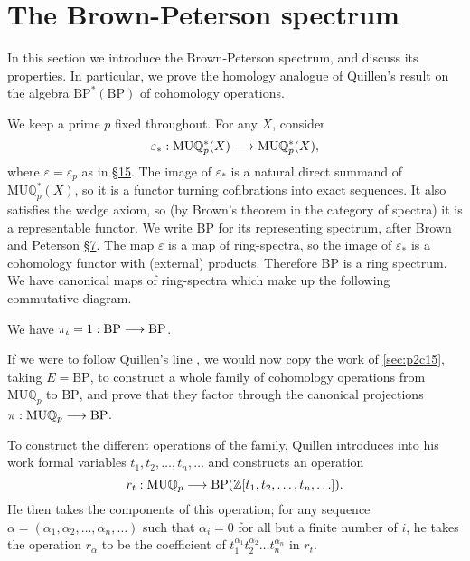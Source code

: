 \documentclass[../main]{subfiles}
\begin{document}
\label{sec:p2c16}
\chapter{The Brown-Peterson spectrum}
In this section we introduce the Brown-Peterson spectrum, and discuss its properties. In particular, we prove the homology analogue of Quillen's result on the algebra $\mathrm{BP}^\ast(\mathrm {BP})$ of cohomology operations.

We keep a prime $p$ fixed throughout. For any $X$, consider $$\varepsilon_\ast : \mathrm{MU} \mathbb Q_p^\ast(X) \overset{}{\longrightarrow} \mathrm{MU} \mathbb Q_p^\ast(X),$$ where $\varepsilon = \varepsilon_p$ as in \hyperref[sec:p2c15]{\S 15}. The image of $\varepsilon_\ast$ is a natural direct summand of $\mathrm {MU} \mathbb Q_p^\ast(X)$, so it is a functor turning cofibrations into exact sequences. It also satisfies the wedge axiom, so (by Brown's theorem in the category of spectra) it is a representable functor. We write $\mathrm{BP}$ for its representing spectrum, after Brown and Peterson \hyperref[sec:p2c7]{\S 7}. The map $\varepsilon$ is a map of ring-spectra, so the image of $\varepsilon_\ast$ is a cohomology functor with (external) products. Therefore BP is a ring spectrum. We have canonical maps of ring-spectra which make up the following commutative diagram. 

\begin{center}
\end{center}

We have $\pi_\iota = 1 : \mathrm{BP} \overset{}{\longrightarrow} \mathrm{BP}$.

If we were to follow Quillen's line \cite{quillen}, we would now copy the work of \ref{sec:p2c15}, taking $E = \mathrm{BP}$, to construct a whole family of cohomology operations from $\mathrm{MU} \mathbb Q_p$ to $\mathrm{BP}$, and prove that they factor through the canonical projections $\pi : \mathrm{MU} \mathbb Q_p \overset{}{\longrightarrow} \mathrm{BP}$. 

To construct the different operations of the family, Quillen introduces into his work formal variables $t_1, t_2, \ldots, t_n, \ldots$ and constructs an operation $$r_t : \mathrm{MU} \mathbb Q_p \overset{}{\longrightarrow} \mathrm{BP}(\mathbb Z[t_1, t_2, \ldots, t_n, \ldots]).$$ He then takes the components of this operation; for any sequence $\alpha = (\alpha_1, \alpha_2, \ldots, \alpha_n, \ldots)$ such that $\alpha_i = 0$ for all but a finite number of $i$, he takes the operation $r_\alpha$ to be the coefficient of $t_1^{\alpha_1} t_2^{\alpha_2} \ldots t_n^{\alpha_n}$ in $r_t$. 
\end{document}
